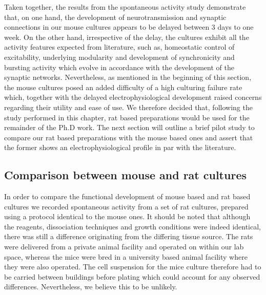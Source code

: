         Taken together, the results from the spontaneous activity study demonstrate that, on one hand, the development of neurotransmission and synaptic connections in our mouse cultures appears to be delayed between 3 days to one week. On the other hand, irrespective of the delay, the cultures exhibit all the activity features expected from literature, such as, homeostatic control of excitability, underlying modularity and development of synchronicity and bursting activity which evolve in accordance with the development of the synaptic networks. Nevertheless, as mentioned in the beginning of this section, the mouse cultures posed an added difficulty of a high culturing failure rate which, together with the delayed electrophysiological development raised concerns regarding their utility and ease of use. We therefore decided that, following the study performed in this chapter, rat based preparations would be used for the remainder of the Ph.D work. The next section will outline a brief pilot study to compare our rat based preparations with the mouse based ones and assert that the former shows an electrophysiological profile in par with the literature.

    \subsection{Comparison between mouse and rat cultures}
    \label{sec:activity:mouseRatComp}
    In order to compare the functional development of mouse based and rat based cultures we recorded spontaneous activity from a set of rat cultures, prepared using a protocol identical to the mouse ones. It should be noted that although the reagents, dissociation techniques and growth conditions were indeed identical, there was still a difference originating from the differing tissue source. The rats were delivered from a private animal facility and operated on within our lab space, whereas the mice were bred in a university based animal facility where they were also operated. The cell suspension for the mice culture therefore had to be carried between buildings before plating which could account for any observed differences. Nevertheless, we believe this to be unlikely.

